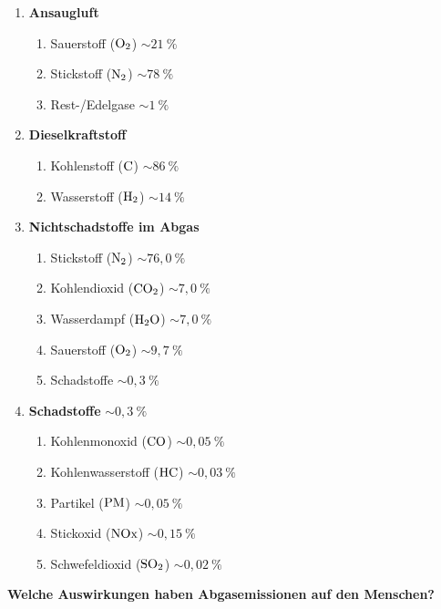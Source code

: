 \begin{enumerate}
\item
  \textbf{Ansaugluft}

  \begin{enumerate}
  \def\labelenumii{\arabic{enumii}.}
  \item
    Sauerstoff ($\ce{O2}$) $\sim 21~\%$
  \item
    Stickstoff ($\ce{N2}$) $\sim 78~\%$
  \item
    Rest-/Edelgase $\sim 1~\%$
  \end{enumerate}
\item
  \textbf{Dieselkraftstoff}

  \begin{enumerate}
  \def\labelenumii{\arabic{enumii}.}
  \item
    Kohlenstoff ($\ce{C}$) $\sim 86~\%$
  \item
    Wasserstoff ($\ce{H2}$) $\sim 14~\%$
  \end{enumerate}
\item
  \textbf{Nichtschadstoffe im Abgas}

  \begin{enumerate}
  \def\labelenumii{\arabic{enumii}.}
  \item
    Stickstoff ($\ce{N2}$) $\sim 76,0~\%$
  \item
    Kohlendioxid ($\ce{CO2}$) $\sim 7,0~\%$
  \item
    Wasserdampf ($\ce{H2O}$) $\sim 7,0~\%$
  \item
    Sauerstoff ($\ce{O2}$) $\sim 9,7~\%$
  \item
    Schadstoffe $\sim 0,3~\%$
  \end{enumerate}
\item
  \textbf{Schadstoffe} $\sim 0,3~\%$

  \begin{enumerate}
  \def\labelenumii{\arabic{enumii}.}
  \item
    Kohlenmonoxid ($\ce{CO}$) $\sim 0,05~\%$
  \item
    Kohlenwasserstoff ($\ce{HC}$) $\sim 0,03~\%$
  \item
    Partikel ($\ce{PM}$) $\sim 0,05~\%$
  \item
    Stickoxid ($\ce{NOx}$) $\sim 0,15~\%$
  \item
    Schwefeldioxid ($\ce{SO2}$) $\sim 0,02~\%$
  \end{enumerate}
\end{enumerate}

\textbf{Welche Auswirkungen haben Abgasemissionen auf den Menschen?}

